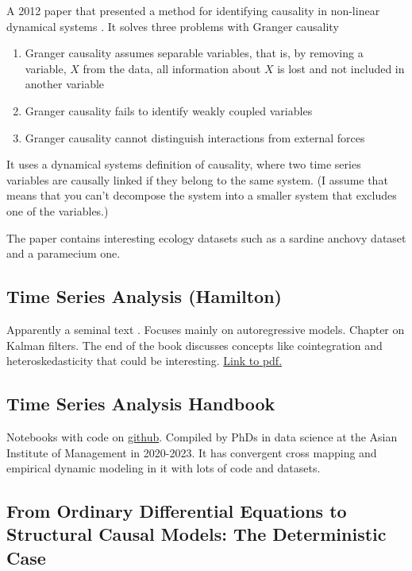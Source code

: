 \documentclass{article}
\begin{document}
        A 2012 paper that presented a method for identifying causality in non-linear dynamical
        systems \cite{sugihara2012detecting}. It solves three problems with Granger causality
        \begin{enumerate}
            \item Granger causality assumes separable variables, that is, by removing a variable,
            $X$ from the data, all information about $X$ is lost and not included in another variable
            \item Granger causality fails to identify weakly coupled variables
            \item Granger causality cannot distinguish interactions from external forces
        \end{enumerate}

        It uses a dynamical systems definition of causality, where two time
        series variables are causally linked if they belong to the same system. (I assume that means 
        that you can't decompose the system into a smaller system that excludes one of the variables.)

        The paper contains interesting ecology datasets such as a sardine anchovy dataset and 
        a paramecium one.

    \subsection{Time Series Analysis (Hamilton)}

        Apparently a seminal text \cite{hamilton1994time}. Focuses mainly on autoregressive models.
        Chapter on Kalman filters. The end of the book discusses concepts like
        cointegration and heteroskedasticity that could be interesting.
        \href{http://mayoral.iae-csic.org/timeseries2021/hamilton.pdf}{Link to pdf.}

    \subsection{Time Series Analysis Handbook}

        Notebooks with code on \href{https://phdinds-aim.github.io/time_series_handbook/Preface/Preface.html}{github}.
        Compiled by PhDs in data science at the Asian Institute of Management in 2020-2023.
        It has convergent cross mapping and empirical dynamic modeling in it with lots of code and datasets.

    \subsection{From Ordinary Differential Equations to Structural Causal Models: The Deterministic Case}
        
\end{document}
